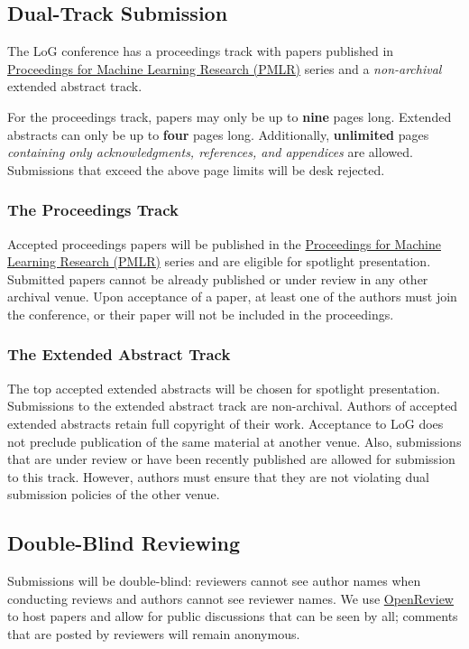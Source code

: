\documentclass{article}
\begin{document}
\subsection{Dual-Track Submission}

The LoG conference has a proceedings track with papers published in \href{https://proceedings.mlr.press/}{Proceedings for Machine Learning Research (PMLR)} series and a \emph{non-archival} extended abstract track.

For the proceedings track, papers may only be up to \textbf{nine} pages long.
Extended abstracts can only be up to \textbf{four} pages long.
Additionally, \textbf{unlimited} pages \emph{containing only acknowledgments, references, and appendices} are allowed.
Submissions that exceed the above page limits will be desk rejected.

\subsubsection{The Proceedings Track}
Accepted proceedings papers will be published in the \href{https://proceedings.mlr.press/}{Proceedings for Machine Learning Research (PMLR)} series and are eligible for spotlight presentation.
Submitted papers cannot be already published or under review in any other archival venue.
Upon acceptance of a paper, at least one of the authors must join the conference, or their paper will not be included in the proceedings.

\subsubsection{The Extended Abstract Track}
The top accepted extended abstracts will be chosen for spotlight presentation.
Submissions to the extended abstract track are non-archival.
Authors of accepted extended abstracts retain full copyright of their work.
Acceptance to LoG does not preclude publication of the same material at another venue.
Also, submissions that are under review or have been recently published are allowed for submission to this track.
However, authors must ensure that they are not violating dual submission policies of the other venue.

\subsection{Double-Blind Reviewing}
Submissions will be double-blind: reviewers cannot see author names when conducting reviews and authors cannot see reviewer names.
We use \href{https://openreview.net/group?id=logconference.io/LoG/2024/Conference}{OpenReview} to host papers and allow for public discussions that can be seen by all; comments that are posted by reviewers will remain anonymous.
\end{document}
